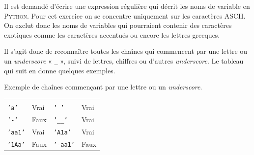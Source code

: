
\begin{exercise}[title=Identificateurs Python, level=intermediate]
Il est demandé d'écrire une expression régulière qui décrit les noms de variable en \textsc{Python}. Pour cet exercice on se concentre uniquement sur les caractères ASCII. On exclut donc les noms de variables qui pourraient contenir des caractères exotiques comme les caractères accentués ou encore les lettres grecques.

Il s'agit donc de reconnaître toutes les chaînes qui commencent par une lettre ou un \textit{underscore} « \texttt{\_} », suivi de lettres, chiffres ou d'autres \textit{underscore}. Le tableau qui suit en donne quelques exemples.

\vspace{2pt}

\begin{jazztable}
\caption{\label{tab:XI.1}Exemple de chaînes commençant par une lettre ou un \emph{underscore}.}
\begin{center}
\small
\renewcommand*{\arraystretch}{1.4}
\begin{tabularx}{0.6666\linewidth}{YYYY}
	&
 &
	&
 \\
\texttt{'a'}		& Vrai & \texttt{' '}		& Vrai \\
\texttt{'-'}		& Faux & \texttt{'\_\_'}& Vrai \\
\texttt{'aa1'}	& Vrai & \texttt{'A1a'}	& Vrai \\
\texttt{'1Aa'}	& Faux & \texttt{'-aa1'}& Faux \\
\end{tabularx}%
\end{center}
\vspace{2pt}
\end{jazztable}
\end{exercise}


